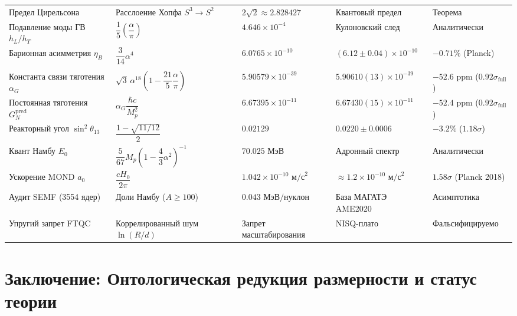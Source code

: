 \documentclass[11pt,a4paper]{article}
\theoremstyle{definition}
\theoremstyle{remark}
\begin{document}
\begin{xltabular}{\textwidth}{
>{\raggedright\arraybackslash}p{3.8cm}
>{\centering\arraybackslash}X
>{\centering\arraybackslash}p{2.7cm}
>{\centering\arraybackslash}p{2.8cm}
>{\centering\arraybackslash}p{2.0cm}
}
Предел Цирельсона & Расслоение Хопфа $S^3 \to S^2$ & $2\sqrt{2} \approx 2.828427$ & Квантовый предел & Теорема \\

Подавление моды ГВ $h_L/h_T$ & $\dfrac{1}{5}\left(\dfrac{\alpha}{\pi}\right)$ & $4.646 \times 10^{-4}$ & Кулоновский след & Аналитически \\

Барионная асимметрия $\eta_B$ & $\dfrac{3}{14}\alpha^4$ & $6.0765 \times 10^{-10}$ & $(6.12 \pm 0.04)\times 10^{-10}$ & $-0.71\%$ (Planck) \\

 \\
\midrule

Константа связи тяготения $\alpha_G$ & $\sqrt{3}\,\alpha^{18}\left(1 - \dfrac{21}{5}\dfrac{\alpha}{\pi}\right)$ & $5.90579 \times 10^{-39}$ & $5.90610(13)\times 10^{-39}$ & $-52.6\text{ ppm}$ ($0.92\sigma_{\mathrm{full}}$) \\

Постоянная тяготения $G_N^{\mathrm{pred}}$ & $\alpha_G \dfrac{\hbar c}{M_p^2}$ & $6.67395 \times 10^{-11}$ & $6.67430(15)\times 10^{-11}$ & $-52.4\text{ ppm}$ ($0.92\sigma_{\mathrm{full}}$) \\

Реакторный угол $\sin^2\theta_{13}$ & $\dfrac{1 - \sqrt{11/12}}{2}$ & $0.02129$ & $0.0220 \pm 0.0006$ & $-3.2\%$ ($1.18\sigma$) \\

Квант Намбу $E_0$ & $\dfrac{5}{67} M_p \left(1 - \dfrac{4}{3}\alpha^2\right)^{-1}$ & $70.025\text{ МэВ}$ & Адронный спектр & Аналитически \\

Ускорение MOND $a_0$ & $\dfrac{c H_0}{2\pi}$ & $1.042 \times 10^{-10}\text{ м/с}^2$ & $\approx 1.2 \times 10^{-10}\text{ м/с}^2$ & $1.58\sigma$ (Planck 2018) \\

Аудит SEMF (3554 ядер) & Доли Намбу ($A \ge 100$) & $0.043\text{ МэВ/нуклон}$ & База МАГАТЭ AME2020 & Асимптотика \\

Упругий запрет FTQC & Коррелированный шум $\ln(R/d)$ & Запрет масштабирования & NISQ-плато & Фальсифицируемо \\

\end{xltabular}
\endgroup


\section{Заключение: Онтологическая редукция размерности и статус теории}
\end{document}
